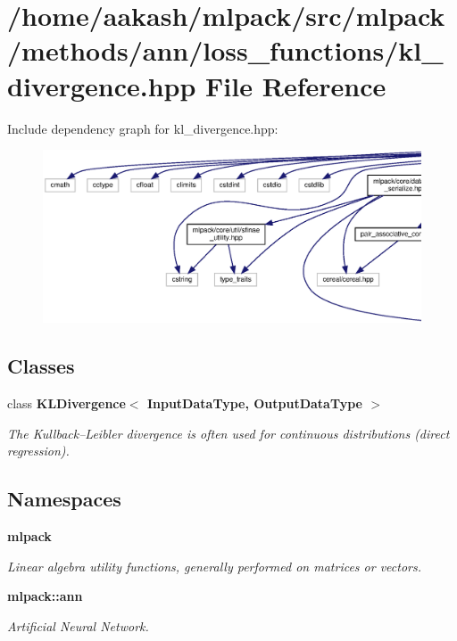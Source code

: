 \section{/home/aakash/mlpack/src/mlpack/methods/ann/loss\+\_\+functions/kl\+\_\+divergence.hpp File Reference}
\label{kl__divergence_8hpp}
Include dependency graph for kl\+\_\+divergence.\+hpp\+:
\nopagebreak
\begin{figure}[H]
\begin{center}
\leavevmode
\includegraphics[width=350pt]{kl__divergence_8hpp__incl}
\end{center}
\end{figure}
\subsection*{Classes}
\begin{DoxyCompactItemize}
\item 
class \textbf{ K\+L\+Divergence$<$ Input\+Data\+Type, Output\+Data\+Type $>$}
\begin{DoxyCompactList}\small\item\em The Kullback–\+Leibler divergence is often used for continuous distributions (direct regression). \end{DoxyCompactList}\end{DoxyCompactItemize}
\subsection*{Namespaces}
\begin{DoxyCompactItemize}
\item 
 \textbf{ mlpack}
\begin{DoxyCompactList}\small\item\em Linear algebra utility functions, generally performed on matrices or vectors. \end{DoxyCompactList}\item 
 \textbf{ mlpack\+::ann}
\begin{DoxyCompactList}\small\item\em Artificial Neural Network. \end{DoxyCompactList}\end{DoxyCompactItemize}


